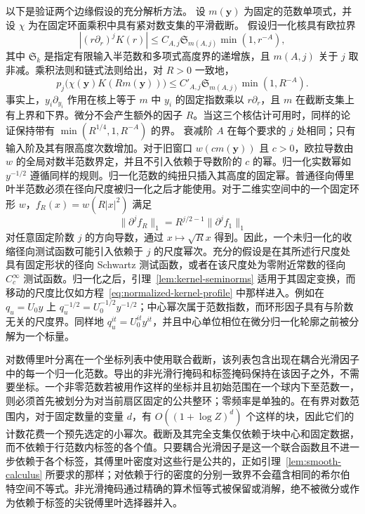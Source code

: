 \documentclass[11pt,a4paper]{article}
\numberwithin{equation}{section}
\numberwithin{figure}{section}
\theoremstyle{definition}
\theoremstyle{remark}
\begin{document}
以下是验证两个边缘假设的充分解析方法。
设 $m(\boldsymbol y)$ 为固定的范数单项式，并设 $\chi$ 为在固定环面乘积中具有紧对数支集的平滑截断。
假设归一化核具有欧拉界
\[
 |(r\partial_r)^jK(r)|\le C_{A,j}\mathfrak S_{m(A,j)}
                                      \min(1,r^{-A}),
\]
其中 $\mathfrak S_k$ 是指定有限输入半范数和多项式高度界的递增族，且 $m(A,j)$ 关于 $j$ 取非减。乘积法则和链式法则给出，对 $R>0$ 一致地，
\begin{equation}\label{eq:normalized-kernel-profile}
 p_j\bigl(\chi(\boldsymbol y)K(Rm(\boldsymbol y))\bigr)
 \le C'_{A,j}\mathfrak S_{m(A,j)}\min(1,R^{-A}).
\end{equation}
事实上，$y_i\partial_{y_i}$ 作用在核上等于 $m$ 中 $y_i$ 的固定指数乘以 $r\partial_r$，且 $m$ 在截断支集上有上界和下界。微分不会产生额外的因子 $R$。当这三个核估计可用时，同样的论证保持带有
$\min(R^{1/4},1,R^{-A})$ 的界。
衰减阶 $A$ 在每个要求的 $j$ 处相同；只有输入阶及其有限高度次数增加。对于旧窗口
$w(c m(\boldsymbol y))$ 且 $c>0$，欧拉导数由 $w$ 的全局对数半范数界定，并且不引入依赖于导数阶的 $c$ 的幂。归一化实数幂如 $y^{-1/2}$ 遵循同样的规则。归一化范数的纯扭只插入其高度的固定幂。普通径向傅里叶半范数必须在径向尺度被归一化之后才能使用。对于二维实空间中的一个固定环形 $w$，$f_R(x)=w(R|x|^2)$ 满足
\[
 \|\partial^j f_R\|_1=R^{j/2-1}\|\partial^j f_1\|_1
\]
对任意固定阶数 $j$ 的方向导数，通过 $x\mapsto\sqrt R x$ 得到。因此，一个未归一化的收缩径向测试函数可能引入依赖于 $j$ 的尺度幂次。充分的假设是在其所述行尺度处具有固定形状的径向 Schwartz 测试函数，或者在该尺度处为零附近常数的径向 $C_c^\infty$ 测试函数。归一化之后，引理~\ref{lem:kernel-seminorms} 适用于其固定变换，而移动的尺度比仅如方程~\eqref{eq:normalized-kernel-profile} 中那样进入。例如在 $q_u=U_0y$ 上 $q_u^{-1/2}=U_0^{-1/2}y^{-1/2}$；中心幂次属于范数指数，而环形因子具有与阶数无关的尺度界。同样地 $q_u^{it}=U_0^{it}y^{it}$，并且中心单位相位在微分归一化轮廓之前被分解为一个标量。

对数傅里叶分离在一个坐标列表中使用联合截断，该列表包含出现在耦合光滑因子中的每一个归一化范数。导出的非光滑行掩码和标签掩码保持在该因子之外，不需要坐标。一个非零范数若被用作这样的坐标并且初始范围在一个球内下至范数一，则必须首先被划分为对当前扇区固定的公共整环；零频率是单独的。在有界对数范围内，对于固定数量的变量 $d$，有 $O((1+\log Z)^d)$ 个这样的块，因此它们的计数花费一个预先选定的小幂次。截断及其完全支集仅依赖于块中心和固定数据，而不依赖于行范数内标签的各个值。只要耦合光滑因子是这一个联合函数且不进一步依赖于各个标签，其傅里叶密度对这些行是公共的，正如引理~\ref{lem:smooth-calculus} 所要求的那样；对依赖于行的密度的分别一致界不会蕴含相同的希尔伯特空间不等式。非光滑掩码通过精确的算术恒等式被保留或消解，绝不被微分或作为依赖于标签的尖锐傅里叶选择器并入。
\end{document}
